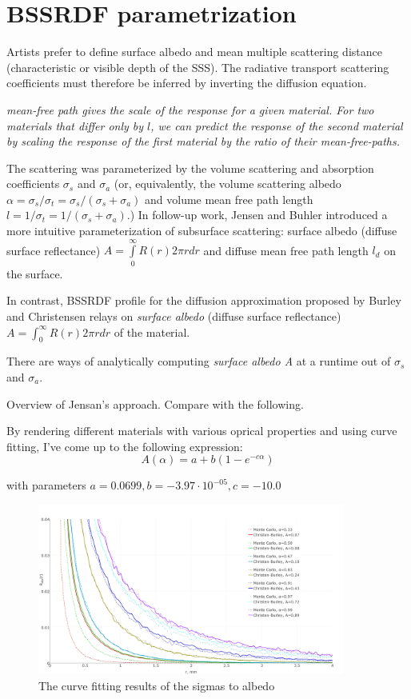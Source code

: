 \section{BSSRDF parametrization}

Artists prefer to define surface albedo and mean multiple scattering distance
(characteristic or visible depth of the SSS). The radiative transport scattering
coefficients must therefore be inferred by inverting the diffusion equation.

\emph{mean-free path gives the scale of the response for a given material. For
two materials that differ only by $l$, we can predict the response of the second
material by scaling the response of the first material by the ratio of their
mean-free-paths.}


The scattering was parameterized by the volume scattering and absorption
coefficients $\sigma_s$ and $\sigma_a$ (or, equivalently, the volume
scattering albedo $\alpha = \sigma_s/\sigma_t = \sigma_s/(\sigma_s + \sigma_a)$
and volume mean free path length $l = 1/\sigma_t = 1/(\sigma_s + \sigma_a)$.)
In follow-up work, Jensen and Buhler \cite{Jensen:2002:RHR:566570.566619}
introduced a more intuitive parameterization of subsurface scattering:
surface albedo (diffuse surface reflectance) $A = \int\limits_0^\infty
R(r)2\pi r dr$ and diffuse mean free path length $l_d$ on the surface.

In contrast, BSSRDF profile for the diffusion approximation proposed by Burley
and Christensen relays on \textit{surface albedo} (diffuse surface reflectance)
$A=\int_0^{\infty} R(r)2\pi rdr$ of the material.

There are ways of analytically computing \textit{surface albedo A} at a runtime
out of $\sigma_s$ and $\sigma_a$.

Overview of Jensan's approach. Compare with the following.

By rendering different materials with various oprical properties and using curve
fitting, I've come up to the following expression:
\[
A(\alpha) = a + b(1- e^{-c\alpha})
\]

with parameters $a = 0.0699, b = -3.97\cdot 10^{-05}, c =-10.0$

\begin{figure}
    \centering
    \includegraphics[width=0.9\textwidth]{imgs/plots/aA_fitting}
    \caption{The curve fitting results of the sigmas to albedo}
    \label{fig:albedo_fitting}
\end{figure}

